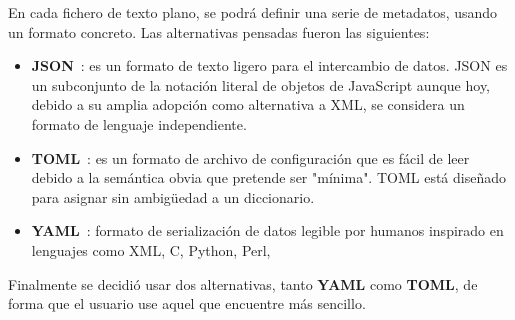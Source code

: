 En cada fichero de texto plano, se podrá definir una serie de metadatos, usando un formato concreto. Las alternativas pensadas fueron
las siguientes:

\begin{itemize}
\item \textbf{JSON}~\cite{json}: es un formato de texto ligero para el intercambio de datos. JSON es un subconjunto de la notación literal de
objetos de JavaScript aunque hoy, debido a su amplia adopción como alternativa a XML, se considera un formato de lenguaje independiente.
\item \textbf{TOML}~\cite{toml}: es un formato de archivo de configuración que es fácil de leer debido a la semántica obvia que pretende ser
"mínima". TOML está diseñado para asignar sin ambigüedad a un diccionario.
\item \textbf{YAML}~\cite{yaml}: formato de serialización de datos legible por humanos inspirado en lenguajes como XML, C, Python, Perl,
\end{itemize}


Finalmente se decidió usar dos alternativas, tanto \textbf{YAML} como \textbf{TOML}, de forma que el usuario use aquel que encuentre más
sencillo.

